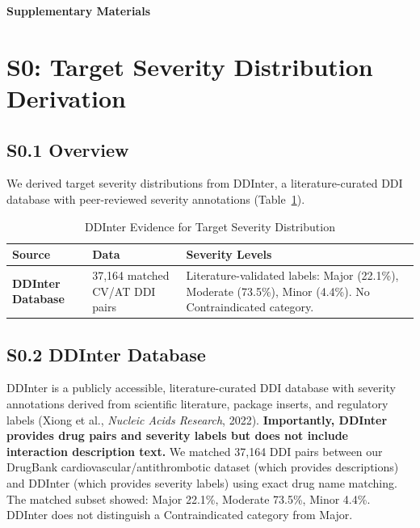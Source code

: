 \documentclass[11pt,a4paper]{article}
\begin{document}
\begin{center}
\Large\textbf{Supplementary Materials}
\end{center}

\tableofcontents
\newpage

\section{S0: Target Severity Distribution Derivation}

\subsection{S0.1 Overview}

We derived target severity distributions from DDInter, a literature-curated DDI database with peer-reviewed severity annotations (Table~\ref{tab:derivation}).

\begin{table}[h]
\centering
\scriptsize
\caption{DDInter Evidence for Target Severity Distribution}
\label{tab:derivation}
\begin{tabular}{@{}p{3.0cm}p{4.5cm}p{5.0cm}@{}}
\toprule
\textbf{Source} & \textbf{Data} & \textbf{Severity Levels} \\
\midrule
\textbf{DDInter Database} & 37,164 matched CV/AT DDI pairs & Literature-validated labels: Major (22.1\%), Moderate (73.5\%), Minor (4.4\%). No Contraindicated category. \\
\bottomrule
\end{tabular}
\end{table}

\subsection{S0.2 DDInter Database}

DDInter is a publicly accessible, literature-curated DDI database with severity annotations derived from scientific literature, package inserts, and regulatory labels (Xiong et al., \textit{Nucleic Acids Research}, 2022). \textbf{Importantly, DDInter provides drug pairs and severity labels but does not include interaction description text.} We matched 37,164 DDI pairs between our DrugBank cardiovascular/antithrombotic dataset (which provides descriptions) and DDInter (which provides severity labels) using exact drug name matching. The matched subset showed: Major 22.1\%, Moderate 73.5\%, Minor 4.4\%. DDInter does not distinguish a Contraindicated category from Major.
\end{document}
